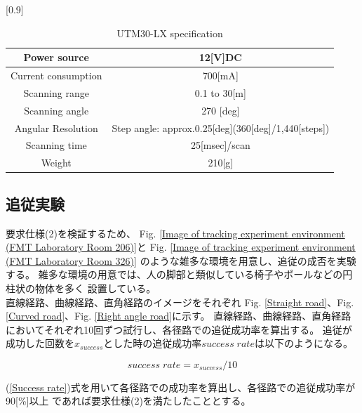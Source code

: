 \begin{table}[h]
  \begin{center}
    \caption{{UTM30-LX specification}\label{UTM30-LX specification}}
    \scalebox{1.0}[0.9]{
      \begin{tabular}{c|c} \hline
        Power source & 12[V]DC \\ \hline
        Current consumption & 700[mA] \\ \hline
        Scanning range & 0.1 to 30[m] \\ \hline
        Scanning angle & 270 [deg] \\ \hline
        Angular Resolution & Step angle: approx.0.25[deg](360[deg]/1,440[steps]) \\ \hline
        Scanning time & 25[msec]/scan \\ \hline
        Weight & 210[g] \\ \hline
      \end{tabular}
    }
  \end{center}
\end{table}

\subsection{追従実験}
要求仕様(2)を検証するため、
Fig. \ref{Image of tracking experiment environment (FMT Laboratory Room 206)}と
Fig. \ref{Image of tracking experiment environment (FMT Laboratory Room 326)}
のような雑多な環境を用意し、追従の成否を実験する。
雑多な環境の用意では、人の脚部と類似している椅子やポールなどの円柱状の物体を多く
設置している。\\ \indent
直線経路、曲線経路、直角経路のイメージをそれぞれ
Fig. \ref{Straight road}、Fig. \ref{Curved road}、Fig. \ref{Right angle road}に示す。
直線経路、曲線経路、直角経路においてそれぞれ10回ずつ試行し、各径路での追従成功率を算出する。
追従が成功した回数を$x_{success}$とした時の追従成功率$success \; rate$は以下のようになる。

\begin{equation}
\label{Success rate}
  success \; rate = x_{success} / 10
\end{equation}

(\ref{Success rate})式を用いて各径路での成功率を算出し、各径路での追従成功率が90[\%]以上
であれば要求仕様(2)を満たしたこととする。

